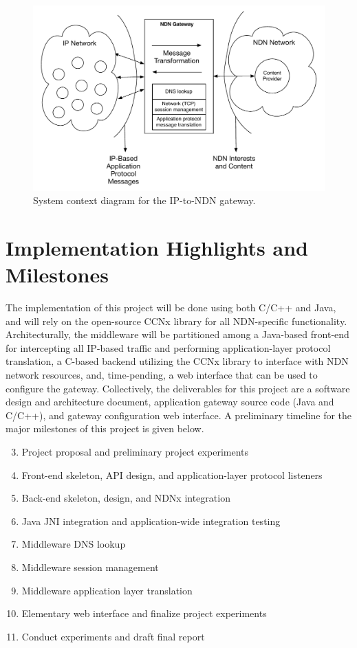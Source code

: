 \documentclass[10pt]{article}
\begin{document}
\begin{figure}
\begin{center}
\includegraphics[scale=0.5]{../../sketches/gateway_highlevel.pdf}
\caption{System context diagram for the IP-to-NDN gateway.}
\end{center}
\end{figure}

\section{Implementation Highlights and Milestones}
The implementation of this project will be done using both C/C++ and Java, and will rely on the open-source CCNx \cite{ccnx} library for all NDN-specific functionality. Architecturally, the middleware will be partitioned among a Java-based front-end for intercepting all IP-based traffic and performing application-layer protocol translation, a C-based backend utilizing the CCNx library to interface with NDN network resources, and, time-pending, a web interface that can be used to configure the gateway. Collectively, the deliverables for this project are a software design and architecture document, application gateway source code (Java and C/C++), and gateway configuration web interface. A preliminary timeline for the major milestones of this project is given below.

\begin{enumerate}[{\bf Week} 1:]
	\setcounter{enumi}{2}
	\item Project proposal and preliminary project experiments
	\item Front-end skeleton, API design, and application-layer protocol listeners
	\item Back-end skeleton, design, and NDNx integration
	\item Java JNI integration and application-wide integration testing
	\item Middleware DNS lookup
	\item Middleware session management
	\item Middleware application layer translation
	\item Elementary web interface and finalize project experiments
	\item Conduct experiments and draft final report 
\end{enumerate}
\end{document}
